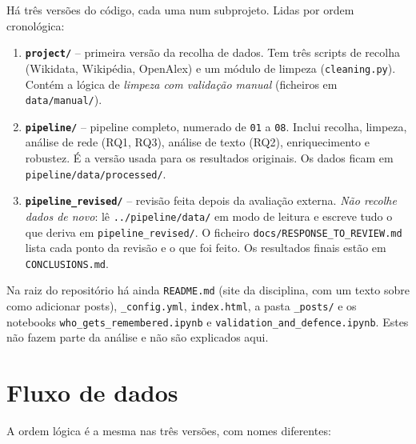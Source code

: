 \documentclass[11pt,a4paper]{article}
\newcommand{\file}[1]{\texttt{#1}}
\begin{document}
Há três versões do código, cada uma num subprojeto. Lidas por ordem cronológica:

\begin{enumerate}
  \item \textbf{\file{project/}} -- primeira versão da recolha de dados. Tem três scripts de recolha (Wikidata, Wikipédia, OpenAlex) e um módulo de limpeza (\file{cleaning.py}). Contém a lógica de \emph{limpeza com validação manual} (ficheiros em \file{data/manual/}).
  \item \textbf{\file{pipeline/}} -- pipeline completo, numerado de \file{01} a \file{08}. Inclui recolha, limpeza, análise de rede (RQ1, RQ3), análise de texto (RQ2), enriquecimento e robustez. É a versão usada para os resultados originais. Os dados ficam em \file{pipeline/data/processed/}.
  \item \textbf{\file{pipeline_revised/}} -- revisão feita depois da avaliação externa. \emph{Não recolhe dados de novo}: lê \file{../pipeline/data/} em modo de leitura e escreve tudo o que deriva em \file{pipeline_revised/}. O ficheiro \file{docs/RESPONSE_TO_REVIEW.md} lista cada ponto da revisão e o que foi feito. Os resultados finais estão em \file{CONCLUSIONS.md}.
\end{enumerate}

Na raiz do repositório há ainda \file{README.md} (site da disciplina, com um texto sobre como adicionar posts), \file{_config.yml}, \file{index.html}, a pasta \file{_posts/} e os notebooks \file{who_gets_remembered.ipynb} e \file{validation_and_defence.ipynb}. Estes não fazem parte da análise e não são explicados aqui.

\section{Fluxo de dados}

A ordem lógica é a mesma nas três versões, com nomes diferentes:
\end{document}
